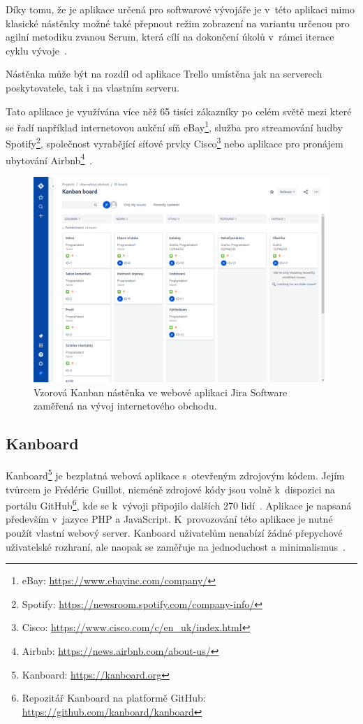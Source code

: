 Díky tomu, že je aplikace určená pro softwarové vývojáře je v~této aplikaci mimo klasické nástěnky možné také přepnout režim zobrazení na variantu určenou pro agilní metodiku zvanou Scrum, která cílí na dokončení úkolů v~rámci iterace cyklu vývoje~\cite{bib:trello-vs-jira-2020}.

Nástěnka může být na rozdíl od aplikace Trello umístěna jak na serverech poskytovatele, tak i na vlastním serveru.

Tato aplikace je využívána více něž 65 tisíci zákazníky po celém světě mezi které se řadí například internetovou aukční síň eBay\footnote{eBay: \url{https://www.ebayinc.com/company/}}, služba pro streamování hudby Spotify\footnote{Spotify: \url{https://newsroom.spotify.com/company-info/}}, společnost vyrabějící síťové prvky Cisco\footnote{Cisco: \url{https://www.cisco.com/c/en_uk/index.html}} nebo aplikace pro pronájem ubytování Airbnb\footnote{Airbnb: \url{https://news.airbnb.com/about-us/}}~\cite{bib:jira-homepage}.

\begin{figure}[H]
	\centering
	\includegraphics[width=\textwidth]{obrazky-figures/jira.png}
	\caption{Vzorová Kanban nástěnka ve webové aplikaci Jira Software zaměřená na vývoj internetového obchodu.}
\end{figure}

\subsection{Kanboard}
Kanboard\footnote{Kanboard: \url{https://kanboard.org}} je bezplatná webová aplikace s~otevřeným zdrojovým kódem. Jejím tvůrcem je Frédéric Guillot, nicméně zdrojové kódy jsou volně k~dispozici na portálu GitHub\footnote{Repozitář Kanboard na platformě GitHub: \url{https://github.com/kanboard/kanboard}}, kde se k~vývoji připojilo dalších 270 lidí~\cite{bib:kanboard-github}. Aplikace je napsaná především v~jazyce PHP a JavaScript. K~provozování této aplikace je nutné použít vlastní webový server. Kanboard uživatelům nenabízí žádné přepychové uživatelské rozhraní, ale naopak se zaměřuje na jednoduchost a minimalismus~\cite{bib:kanboard}.

